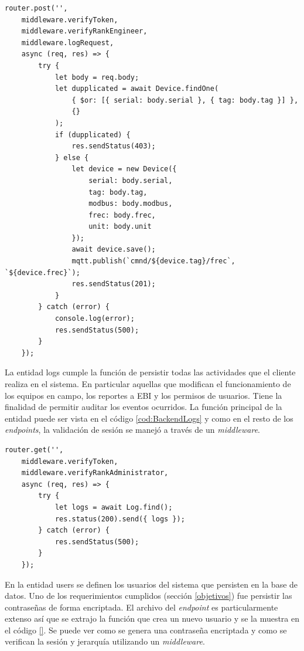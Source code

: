 \begin{lstlisting}[label=cod:BackendDevices,caption=Creación de dispositivo de la entidad devices]
router.post('',
    middleware.verifyToken,
    middleware.verifyRankEngineer,
    middleware.logRequest,
    async (req, res) => {
        try {
            let body = req.body;
            let dupplicated = await Device.findOne(
                { $or: [{ serial: body.serial }, { tag: body.tag }] },
                {}
            );
            if (dupplicated) {
                res.sendStatus(403);
            } else {
                let device = new Device({
                    serial: body.serial,
                    tag: body.tag,
                    modbus: body.modbus,
                    frec: body.frec,
                    unit: body.unit
                });
                await device.save();
                mqtt.publish(`cmnd/${device.tag}/frec`, `${device.frec}`);
                res.sendStatus(201);
            }
        } catch (error) {
            console.log(error);
            res.sendStatus(500);
        }
    });
\end{lstlisting}

La entidad logs cumple la función de persistir todas las actividades que el cliente realiza en el sistema.
En particular aquellas que modifican el funcionamiento de los equipos en campo, los reportes a EBI y los permisos de usuarios.
Tiene la finalidad de permitir auditar los eventos ocurridos.
La función principal de la entidad puede ser vista en el código \ref{cod:BackendLogs} y como en el resto de los \emph{endpoints}, la validación de sesión se manejó a través de un \emph{middleware}.

\newpage

\begin{lstlisting}[label=cod:BackendLogs,caption=Función principal de la entidad logs]
router.get('',
    middleware.verifyToken,
    middleware.verifyRankAdministrator,
    async (req, res) => {
        try {
            let logs = await Log.find();
            res.status(200).send({ logs });
        } catch (error) {
            res.sendStatus(500);
        }
    });
\end{lstlisting}

En la entidad users se definen los usuarios del sistema que persisten en la base de datos.
Uno de los requerimientos cumplidos (sección \ref{objetivos}) fue persistir las contraseñas de forma encriptada.
El archivo del \emph{endpoint} es particularmente extenso así que se extrajo la función que crea un nuevo usuario y se la muestra en el código \ref{}.
Se puede ver como se genera una contraseña encriptada y como se verifican la sesión y jerarquía utilizando un \emph{middleware}.

